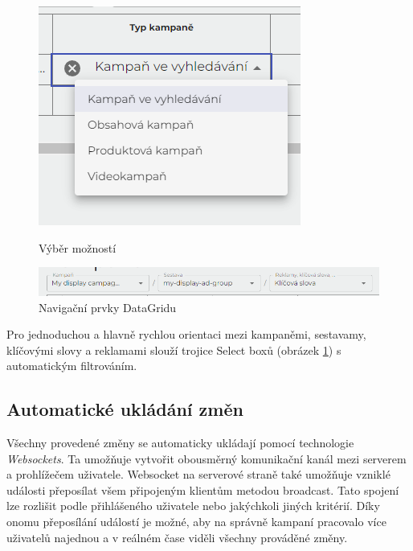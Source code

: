\begin{figure}
    \begin{minipage}{.5\textwidth}
        \centering
        \includegraphics[width=.7\textwidth]{Figures/ui/cell-choices.png}
        \caption{Výběr možností}        
        \label{fig:cell-choices}
    \end{minipage}
    \begin{minipage}{.5\textwidth}
        \centering
        \includegraphics[width=1\textwidth]{Figures/ui/datagrid-controls.png}
        \caption{Navigační prvky DataGridu}        
        \label{fig:datagrid-controls}
    \end{minipage}
\end{figure}

Pro jednoduchou a hlavně rychlou orientaci mezi kampaněmi, sestavamy, klíčovými slovy a reklamami slouží trojice Select boxů (obrázek \ref{fig:datagrid-controls}) s automatickým filtrováním.



\subsection{Automatické ukládání změn}
Všechny provedené změny se automaticky ukládají pomocí technologie \emph{Websockets}. Ta umožňuje vytvořit obousměrný komunikační kanál mezi serverem a prohlížečem uživatele.
Websocket na serverové straně také umožňuje vzniklé události přeposílat všem připojeným klientům metodou broadcast. Tato spojení lze rozlišit podle přihlášeného uživatele nebo jakýchkoli jiných
kritérií. Díky onomu přeposílání událostí je možné, aby na správně kampaní pracovalo více uživatelů najednou a v reálném čase viděli všechny prováděné změny.

